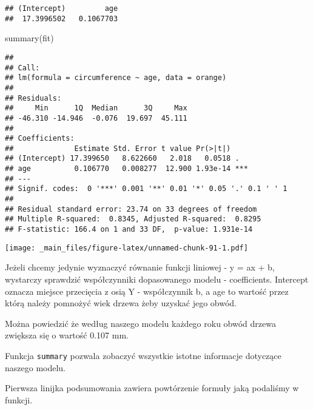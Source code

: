 \documentclass[
]{book}
\newenvironment{Shaded}{\begin{snugshade}}{\end{snugshade}}
\newcommand{\AttributeTok}[1]{\textcolor[rgb]{0.77,0.63,0.00}{#1}}
\newcommand{\FunctionTok}[1]{\textcolor[rgb]{0.00,0.00,0.00}{#1}}
\newcommand{\NormalTok}[1]{#1}
\newcommand{\SpecialCharTok}[1]{\textcolor[rgb]{0.00,0.00,0.00}{#1}}
\newcommand{\StringTok}[1]{\textcolor[rgb]{0.31,0.60,0.02}{#1}}
\begin{document}
\begin{verbatim}
## (Intercept)         age 
##  17.3996502   0.1067703
\end{verbatim}

\begin{Shaded}
\begin{Highlighting}[]
\FunctionTok{summary}\NormalTok{(fit)}
\end{Highlighting}
\end{Shaded}

\begin{verbatim}
## 
## Call:
## lm(formula = circumference ~ age, data = orange)
## 
## Residuals:
##     Min      1Q  Median      3Q     Max 
## -46.310 -14.946  -0.076  19.697  45.111 
## 
## Coefficients:
##              Estimate Std. Error t value Pr(>|t|)    
## (Intercept) 17.399650   8.622660   2.018   0.0518 .  
## age          0.106770   0.008277  12.900 1.93e-14 ***
## ---
## Signif. codes:  0 '***' 0.001 '**' 0.01 '*' 0.05 '.' 0.1 ' ' 1
## 
## Residual standard error: 23.74 on 33 degrees of freedom
## Multiple R-squared:  0.8345, Adjusted R-squared:  0.8295 
## F-statistic: 166.4 on 1 and 33 DF,  p-value: 1.931e-14
\end{verbatim}

\begin{Shaded}
\end{Shaded}

\texttt{[image: \_main\_files/figure-latex/unnamed-chunk-91-1.pdf]}

Jeżeli chcemy jedynie wyznaczyć równanie funkcji liniowej - y = ax + b, wystarczy sprawdzić współczynniki dopasowanego modelu - coefficients. Intercept oznacza miejsce przecięcia z osią Y - współczynnik b, a age to wartość przez którą należy pomnożyć wiek drzewa żeby uzyskać jego obwód.

Można powiedzić że według naszego modelu każdego roku obwód drzewa zwiększa się o wartość 0.107 mm.

Funkcja \texttt{summary} pozwala zobaczyć wszystkie istotne informacje dotyczące naszego modelu.

Pierwsza linijka podsumowania zawiera powtórzenie formuły jaką podaliśmy w funkcji.
\end{document}
